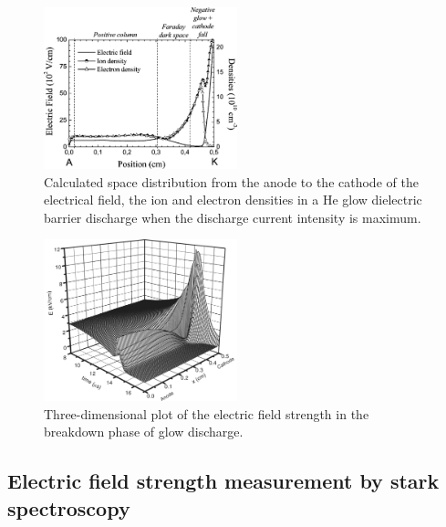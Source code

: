 \documentclass[a4paper,10pt,twoside]{article}
\begin{document}
				\begin{figure}
					\centering
					\includegraphics[width=0.5\textwidth]{figures/lineratio/massinesp3fig5.pdf}
					\caption{Calculated space distribution from the anode to the cathode of	the electrical field, the ion and electron densities in a He glow dielectric barrier discharge when the discharge current intensity is maximum. \cite{Massines}}
					\label{img:massines}
				\end{figure}
		
				\begin{figure}
					\centering
					\includegraphics[width=0.5\textwidth]{figures/lineratio/golubovskiip47fig9}
					\caption{Three-dimensional plot of the electric field strength in the breakdown phase of glow discharge. \cite{0022-3727-36-1-306}}
					\label{img:golubovskii}
				\end{figure}
				
		\subsection{Electric field strength measurement by stark spectroscopy}
		
\end{document}
